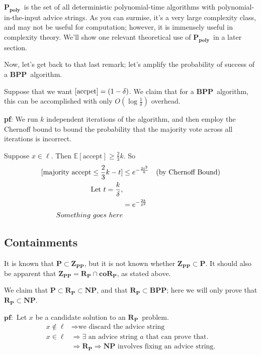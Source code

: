 \documentclass[11pt]{article}
\let\Pr\relax
\DeclareMathOperator*{\Pr}{\mathbb{P}}
\newcommand{\Pt}{\ensuremath{\mathbf{P}}}
\newcommand{\NP}{\ensuremath{\mathbf{NP}}}
\newcommand{\BPP}{\ensuremath{\mathbf{BPP}}}
\newcommand{\ZPP}{\ensuremath{\mathbf{Z_{PP}}}}
\newcommand{\RP}{\ensuremath{\mathbf{R_{P}}}}
\newcommand{\coRP}{\ensuremath{\mathbf{coR_{P}}}}
\newcommand{\Ppoly}{\ensuremath{\mathbf{P_{poly}}}}
\begin{document}
\Ppoly\ is the set of all deterministic polynomial-time algorithms with polynomial-in-the-input advice strings. As you can surmise, it's a very large complexity class, and may not be useful for computation; however, it is immensely useful in complexity theory.
We'll show one relevant theoretical use of \Ppoly\ in a later section.

Now, let's get back to that last remark; let's amplify the probability of success of a \BPP\ algorithm.

Suppose that we want $\Pr[\text{accpet}] = (1-\delta)$. We claim that for a \BPP\ algorithm, this can be accomplished with only $O(\log{\frac{1}{\delta}})$ overhead.

\textbf{pf}: We run $k$ independent iterations of the algorithm, and then employ the Chernoff bound to bound the probability that the majority vote across all iterations is incorrect.

Suppose $x\in\ell$. Then $\mathbb{E}[\text{accept}] \geq \frac{2}{3}k$.
So
\begin{align*}
  \Pr[\text{majority accept} \leq \frac{2}{3}k - t] &\leq e^{-{\frac{2t^2}{k}}} &&\text{(by Chernoff Bound)} \\
  \text{Let } t = \frac{k}{\delta}, \\
  &= e^{-{\frac{2k}{{\delta}^2}}} \\
  Something\ goes\ here
\end{align*}

\subsection{Containments}

It is known that $\Pt\subset\ZPP$, but it is not known whether $\ZPP\subset\Pt$.
It should also be apparent that $\ZPP = \RP\cap\coRP$, as stated above.

We claim that $\Pt\subset\RP\subset\NP$, and that $\RP\subset\BPP$; here we will only prove that $\RP\subset\NP$.

$\mathbf{pf: }$
Let $x$ be a candidate solution to an \RP\ problem.
\begin{align*}
  x\notin\ell &\Rightarrow \text{we discard the advice string}\\
  x\in\ell &\Rightarrow \exists\text{ an advice string $a$ that can prove that.}\\
  &\Rightarrow \RP \Rightarrow \NP \text{ involves fixing an advice string.}
\end{align*}
\end{document}
